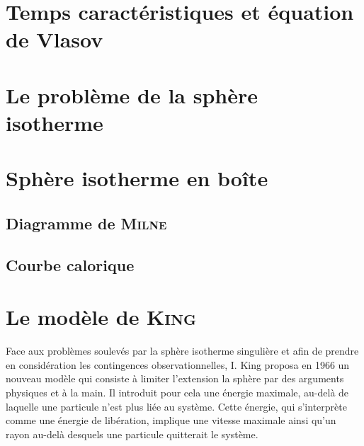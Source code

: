 \chapter{Temps caractéristiques et équation de Vlasov\label{Chap::TempsCarac}}
	\minitoc

	

	

\chapter{Le problème de la sphère isotherme}
		\minitoc
		
		

\chapter{Sphère isotherme en boîte\label{SIB::Chapitre}}
	\minitoc

	\section{Diagramme de \textsc{Milne}}
		

	\section{Courbe calorique}
		

%			

\chapter{Le modèle de \textsc{King}\label{King::Chapitre}}
	\minitoc

	Face aux problèmes soulevés par la sphère isotherme singulière et afin de prendre en considération les contingences observationnelles, I.
	King proposa en 1966 un nouveau modèle qui consiste à limiter l'extension la sphère par des arguments physiques et \og à la main\fg. Il
	introduit pour cela une énergie maximale, au-delà de laquelle une particule n'est plus liée au système. Cette énergie, qui s'interprète comme
	une énergie de libération, implique une vitesse maximale ainsi qu'un rayon au-delà desquels une particule quitterait le système.

